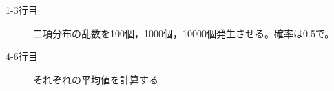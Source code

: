 \begin{description}
	\item[1-3行目] 二項分布の乱数を100個，1000個，10000個発生させる。確率は0.5で。
	\item[4-6行目] それぞれの平均値を計算する
\end{description}
